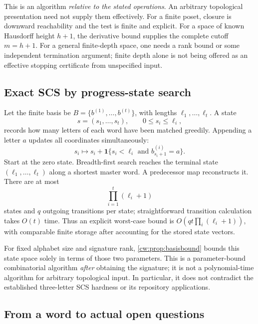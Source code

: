 \documentclass[11pt,letterpaper]{article}
\numberwithin{equation}{section}
\theoremstyle{definition}
\theoremstyle{remark}
\theoremstyle{definition}
\begin{document}
This is an algorithm \emph{relative to the stated operations}. An arbitrary
topological presentation need not supply them effectively. For a finite
poset, closure is downward reachability and the test is finite and explicit.
For a space of known Hausdorff height $h+1$, the derivative bound supplies the
complete cutoff $m=h+1$. For a general finite-depth space, one needs a rank
bound or some independent termination argument; finite depth alone is not
being offered as an effective stopping certificate from unspecified input.

\subsection{Exact SCS by progress-state search}

Let the finite basis be $B=\{b^{(1)},\ldots,b^{(t)}\}$, with lengths
$\ell_1,\ldots,\ell_t$. A state
\[
 s=(s_1,\ldots,s_t),\qquad 0\le s_i\le\ell_i,
\]
records how many letters of each word have been matched greedily.
Appending a letter $a$ updates all coordinates simultaneously:
\begin{equation}\label{cw:eq:transition}
 s_i\longmapsto s_i+
 \mathbf 1\{s_i<\ell_i\text{ and }b^{(i)}_{s_i+1}=a\}.
\end{equation}
Start at the zero state. Breadth-first search reaches the terminal state
$(\ell_1,\ldots,\ell_t)$ along a shortest master word. A predecessor map
reconstructs it. There are at most
\begin{equation}\label{cw:eq:states}
 \prod_{i=1}^t(\ell_i+1)
\end{equation}
states and $q$ outgoing transitions per state; straightforward transition
calculation takes $O(t)$ time. Thus an explicit worst-case bound is
$O(qt\prod_i(\ell_i+1))$, with comparable finite storage after accounting
for the stored state vectors.

For fixed alphabet size and signature rank, \cref{cw:prop:basisbound} bounds
this state space solely in terms of those two parameters. This is a
parameter-bound combinatorial algorithm \emph{after} obtaining the signature;
it is not a polynomial-time algorithm for arbitrary topological input.
In particular, it does not contradict the established three-letter SCS
hardness \cite{LT} or its repository applications.

\subsection{From a word to actual open questions}
\end{document}
